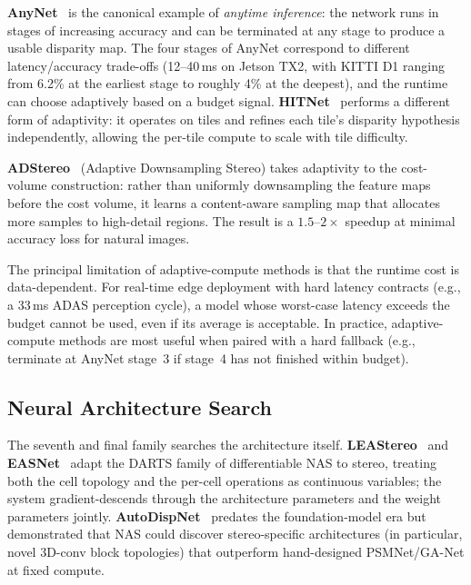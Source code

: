 \textbf{AnyNet}~\cite{wang2019anynet} is the canonical example of \emph{anytime inference}: the network runs in stages of increasing accuracy and can be terminated at any stage to produce a usable disparity map. The four stages of AnyNet correspond to different latency/accuracy trade-offs (12--40\,ms on Jetson TX2, with KITTI D1 ranging from 6.2\% at the earliest stage to roughly 4\% at the deepest), and the runtime can choose adaptively based on a budget signal. \textbf{HITNet}~\cite{tankovich2021hitnet} performs a different form of adaptivity: it operates on tiles and refines each tile's disparity hypothesis independently, allowing the per-tile compute to scale with tile difficulty.

\textbf{ADStereo}~\cite{wang2023adstereo} (Adaptive Downsampling Stereo) takes adaptivity to the cost-volume construction: rather than uniformly downsampling the feature maps before the cost volume, it learns a content-aware sampling map that allocates more samples to high-detail regions. The result is a $1.5$--$2\times$ speedup at minimal accuracy loss for natural images.

The principal limitation of adaptive-compute methods is that the runtime cost is data-dependent. For real-time edge deployment with hard latency contracts (e.g., a 33\,ms ADAS perception cycle), a model whose worst-case latency exceeds the budget cannot be used, even if its average is acceptable. In practice, adaptive-compute methods are most useful when paired with a hard fallback (e.g., terminate at AnyNet stage~3 if stage~4 has not finished within budget).

\subsection{Neural Architecture Search}
\label{ssec:nas}

The seventh and final family searches the architecture itself. \textbf{LEAStereo}~\cite{cheng2020leastereo} and \textbf{EASNet}~\cite{wang2022easnet} adapt the DARTS family of differentiable NAS to stereo, treating both the cell topology and the per-cell operations as continuous variables; the system gradient-descends through the architecture parameters and the weight parameters jointly. \textbf{AutoDispNet}~\cite{saikia2019autodispnet} predates the foundation-model era but demonstrated that NAS could discover stereo-specific architectures (in particular, novel 3D-conv block topologies) that outperform hand-designed PSMNet/GA-Net at fixed compute.

